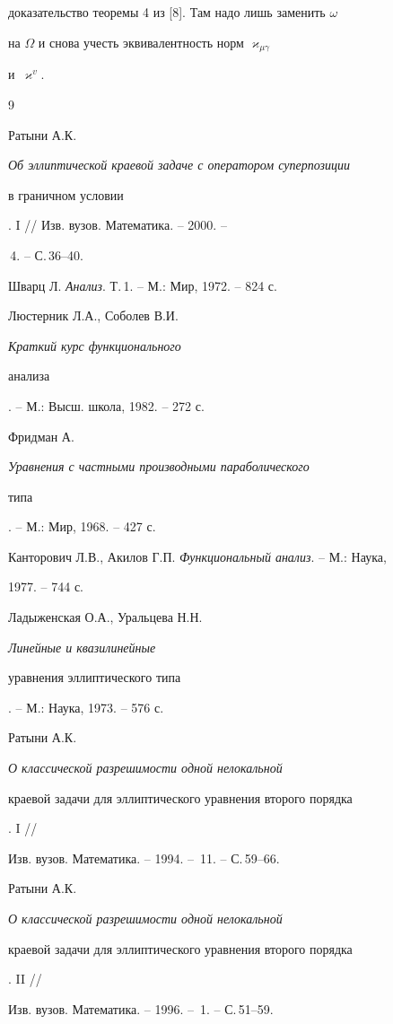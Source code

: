 доказательство теоремы 4 из [8]. Там надо лишь заменить $\omega$ 


на $\Omega$ и снова учесть эквивалентность норм $\varkappa_{\mu\gamma}$


и~$\varkappa^v$. 


 


\begin{thebibliography}{9} 


 




Ратыни А.К. {\em Об эллиптической краевой задаче с оператором суперпозиции 


в граничном условии}. I // Изв. вузов. Математика. -- 2000. -- 


\No\,4. -- С.\,36--40. 




Шварц Л. {\em Анализ}. Т.\,1. -- М.: Мир, 1972. -- 824 с. 




Люстерник Л.А., Соболев В.И. {\em Краткий курс функционального 


анализа}. -- М.: Высш. школа, 1982. -- 272 с. 




Фридман А. {\em Уравнения с частными производными параболического 


типа}. -- М.: Мир, 1968. -- 427 с. 




Канторович Л.В., Акилов Г.П. {\em Функциональный анализ}. -- М.: Наука, 


1977. -- 744 с. 




Ладыженская О.А., Уральцева Н.Н. {\em Линейные и квазилинейные 


уравнения эллиптического типа}. -- М.: Наука, 1973. -- 576 с. 




Ратыни А.К. {\em О классической разрешимости одной нелокальной 


краевой задачи для эллиптического уравнения второго порядка}. I // 


Изв. вузов. Математика. -- 1994. -- \No\,11. -- С.\,59--66. 




Ратыни А.К. {\em О классической разрешимости одной нелокальной 


краевой задачи для эллиптического уравнения второго порядка}. II // 


Изв. вузов. Математика. -- 1996. -- \No\,1. -- С.\,51--59. 


 


\end{thebibliography} 


 


\vskip 2cm 


 






 


\label{end} 


 


